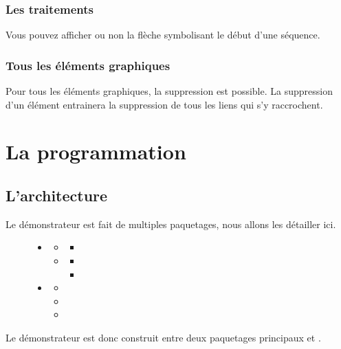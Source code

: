 \documentclass[12pt,a4paper,oneside]{book}
\begin{document}
		\subsubsection{Les traitements}
		Vous pouvez afficher ou non la flèche symbolisant le début d'une séquence.
		\subsubsection{Tous les éléments graphiques}
		Pour tous les éléments graphiques, la suppression est possible. La suppression d'un élément entrainera la suppression de tous les liens qui s'y raccrochent.

	\section{La programmation}
	\subsection{L'architecture}
	Le démonstrateur est fait de multiples paquetages, nous allons les détailler ici.
	\begin{figure}
	\begin{itemize}
		\item {}
			\begin{itemize}
				\item {}
					\begin{itemize}
						\item {}	
					\end{itemize}
				\item {}
					\begin{itemize}
						\item {}
						\item {}
					\end{itemize}
			\end{itemize}
		\item {}
			\begin{itemize}
				\item {}
				\item {}
				\item {}
			\end{itemize}
		\end{itemize}
	\end{figure}
	Le démonstrateur est donc construit entre deux paquetages principaux  et . 
\end{document}
